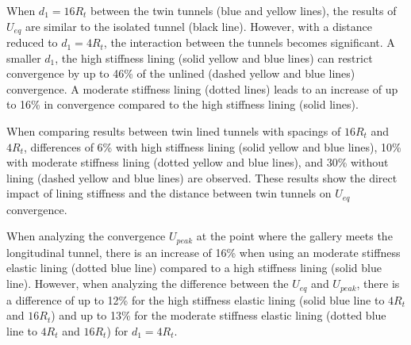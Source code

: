 \documentclass[a4paper,fleqn]{cas-sc}
\begin{document}
When $d_1 = 16R_t$ between the twin tunnels (blue and yellow lines), the results of $U_{eq}$ are similar to the isolated tunnel (black line). However, with a distance reduced to $d_1 = 4R_t$, the interaction between the tunnels becomes significant. A smaller $d_1$, the high stiffness lining (solid yellow and blue lines) can restrict convergence by up to 46\% of the unlined (dashed yellow and blue lines) convergence. A moderate stiffness lining (dotted lines) leads to an increase of up to 16\% in convergence compared to the high stiffness lining (solid lines).

When comparing results between twin lined tunnels with spacings of $16R_t$ and $4R_t$, differences of 6\% with high stiffness lining (solid yellow and blue lines), 10\% with moderate stiffness lining (dotted yellow and blue lines), and 30\% without lining (dashed yellow and blue lines) are observed. These results show the direct impact of lining stiffness and the distance between twin tunnels on $U_{eq}$ convergence.

When analyzing the convergence $U_{peak}$ at the point where the gallery meets the longitudinal tunnel, there is an increase of 16\% when using an moderate stiffness elastic lining (dotted blue line) compared to a high stiffness lining (solid blue line). However, when analyzing the difference between the $U_{eq}$ and $U_{peak}$, there is a difference of up to 12\% for the high stiffness elastic lining (solid blue line to $4R_t$ and $16R_t$) and up to 13\% for the moderate stiffness elastic lining (dotted blue line to $4R_t$ and $16R_t$) for $d_1=4R_t$.
\end{document}

